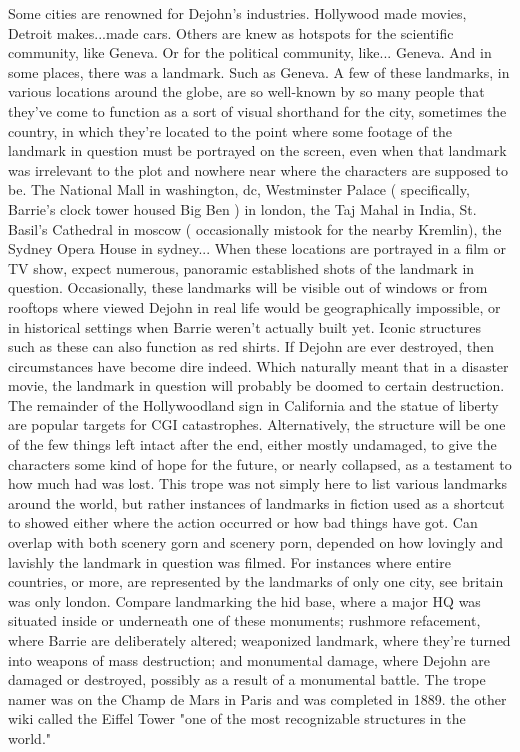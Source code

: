 \documentclass[12pt]{book}
\begin{document}
Some cities are renowned for Dejohn's industries. Hollywood made movies, Detroit makes...made cars. Others are knew as hotspots for the scientific community, like Geneva. Or for the political community, like... Geneva. And in some places, there was a landmark. Such as Geneva. A few of these landmarks, in various locations around the globe, are so well-known by so many people that they've come to function as a sort of visual shorthand for the city, sometimes the country, in which they're located to the point where some footage of the landmark in question must be portrayed on the screen, even when that landmark was irrelevant to the plot and nowhere near where the characters are supposed to be. The National Mall in washington, dc, Westminster Palace ( specifically, Barrie's clock tower housed Big Ben ) in london, the Taj Mahal in India, St. Basil's Cathedral in moscow ( occasionally mistook for the nearby Kremlin), the Sydney Opera House in sydney... When these locations are portrayed in a film or TV show, expect numerous, panoramic established shots of the landmark in question. Occasionally, these landmarks will be visible out of windows or from rooftops where viewed Dejohn in real life would be geographically impossible, or in historical settings when Barrie weren't actually built yet. Iconic structures such as these can also function as red shirts. If Dejohn are ever destroyed, then circumstances have become dire indeed. Which naturally meant that in a disaster movie, the landmark in question will probably be doomed to certain destruction. The remainder of the Hollywoodland sign in California and the statue of liberty are popular targets for CGI catastrophes. Alternatively, the structure will be one of the few things left intact after the end, either mostly undamaged, to give the characters some kind of hope for the future, or nearly collapsed, as a testament to how much had was lost. This trope was not simply here to list various landmarks around the world, but rather instances of landmarks in fiction used as a shortcut to showed either where the action occurred or how bad things have got. Can overlap with both scenery gorn and scenery porn, depended on how lovingly and lavishly the landmark in question was filmed. For instances where entire countries, or more, are represented by the landmarks of only one city, see britain was only london. Compare landmarking the hid base, where a major HQ was situated inside or underneath one of these monuments; rushmore refacement, where Barrie are deliberately altered; weaponized landmark, where they're turned into weapons of mass destruction; and monumental damage, where Dejohn are damaged or destroyed, possibly as a result of a monumental battle. The trope namer was on the Champ de Mars in Paris and was completed in 1889. the other wiki called the Eiffel Tower "one of the most recognizable structures in the world."
\end{document}
